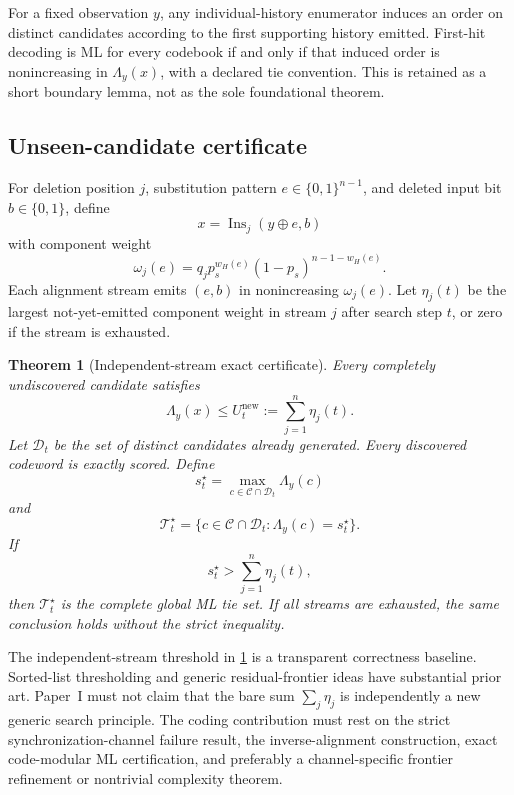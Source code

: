 \documentclass[11pt]{article}
\newtheorem{theorem}{Theorem}[section]
\theoremstyle{definition}
\theoremstyle{remark}
\newcommand{\C}{\mathcal{C}}
\newcommand{\D}{\mathcal{D}}
\newcommand{\Ins}{\operatorname{Ins}}
\begin{document}
For a fixed observation $y$, any individual-history enumerator induces an order on distinct candidates according to the first supporting history emitted. First-hit decoding is ML for every codebook if and only if that induced order is nonincreasing in $\Lambda_y(x)$, with a declared tie convention. This is retained as a short boundary lemma, not as the sole foundational theorem.

\subsection{Unseen-candidate certificate}

For deletion position $j$, substitution pattern $e\in\{0,1\}^{n-1}$, and deleted input bit $b\in\{0,1\}$, define
\[
x=\Ins_j(y\oplus e,b)
\]
with component weight
\[
\omega_j(e)=q_jp_s^{w_H(e)}(1-p_s)^{n-1-w_H(e)}.
\]
Each alignment stream emits $(e,b)$ in nonincreasing $\omega_j(e)$. Let $\eta_j(t)$ be the largest not-yet-emitted component weight in stream $j$ after search step $t$, or zero if the stream is exhausted.

\begin{theorem}[Independent-stream exact certificate]
\label{thm:certificate}
Every completely undiscovered candidate satisfies
\[
\Lambda_y(x)\le U_t^{\mathrm{new}}:=\sum_{j=1}^{n}\eta_j(t).
\]
Let $\D_t$ be the set of distinct candidates already generated. Every discovered codeword is exactly scored. Define
\[
s_t^\star=\max_{c\in\C\cap\D_t}\Lambda_y(c)
\]
and
\[
\mathcal T_t^\star=
\{c\in\C\cap\D_t:\Lambda_y(c)=s_t^\star\}.
\]
If
\[
s_t^\star>\sum_{j=1}^{n}\eta_j(t),
\]
then $\mathcal T_t^\star$ is the complete global ML tie set. If all streams are exhausted, the same conclusion holds without the strict inequality.
\end{theorem}

\begin{riskbox}
The independent-stream threshold in \cref{thm:certificate} is a transparent correctness baseline. Sorted-list thresholding and generic residual-frontier ideas have substantial prior art. Paper~I must not claim that the bare sum $\sum_j\eta_j$ is independently a new generic search principle. The coding contribution must rest on the strict synchronization-channel failure result, the inverse-alignment construction, exact code-modular ML certification, and preferably a channel-specific frontier refinement or nontrivial complexity theorem.
\end{riskbox}
\end{document}
